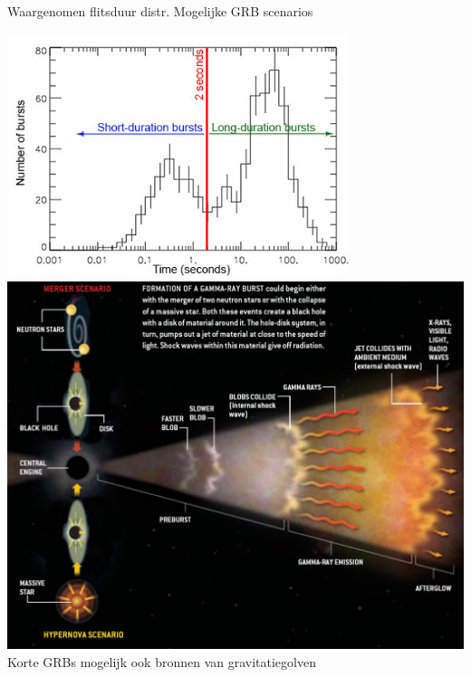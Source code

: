 \Tr
\onecolumn
{\blue Waargenomen flitsduur distr. \hspace*{2cm} Mogelijke GRB scenarios}
\begin{center}
\includegraphics[keepaspectratio,width=10cm]{GRB-T90}
\includegraphics[keepaspectratio,width=16cm]{GRB-phases2}\\[2mm]
{\red Korte GRBs mogelijk ook bronnen van gravitatiegolven} 
\end{center}

